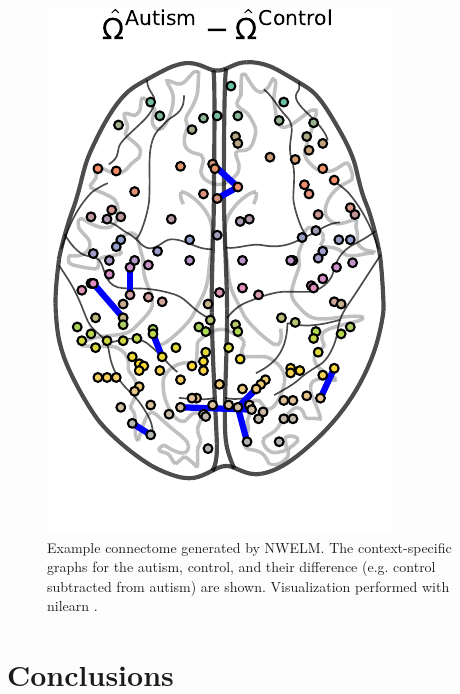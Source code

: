 \documentclass{article}
\begin{document}
\begin{figure}[H]
	\includegraphics[width=\columnwidth]{../../plots/connectomes/diff.pdf}
	\caption{Example connectome generated by NWELM. The context-specific graphs for the autism, control, and their difference (e.g. control subtracted from autism) are shown. Visualization performed with nilearn \cite{abraham2014machine}.}
	\label{fig:connectome}
\end{figure}

\FloatBarrier
\section{Conclusions}
\label{conclusions}
\end{document}
